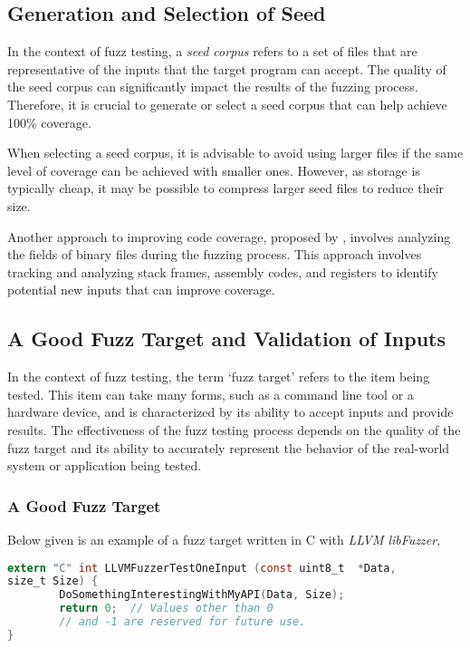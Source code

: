 \subsection{Generation and Selection of Seed}

In the context of fuzz testing, a \textit{seed corpus} refers to a set of files that are representative of
the inputs that the target program can accept. The quality of the seed corpus can significantly
impact the results of the fuzzing process. Therefore, it is crucial to generate or select a
seed corpus that can help achieve 100\% coverage.

When selecting a seed corpus, it is advisable to avoid using larger files if the same level of
coverage can be achieved with smaller ones. However, as storage is typically cheap, it may be
possible to compress larger seed files to reduce their size.

Another approach to improving code coverage, proposed by \cite{kim2011efficient},
involves analyzing the fields of binary files during the fuzzing process. This approach involves
tracking and analyzing stack frames, assembly codes, and registers to identify potential new inputs
that can improve coverage.\newline

\subsection{A Good Fuzz Target and Validation of Inputs}
In the context of fuzz testing, the term `fuzz target' refers to the item being tested.
This item can take many forms, such as a command line tool or a hardware device, and is
characterized by its ability to accept inputs and provide results. The effectiveness of
the fuzz testing process depends on the quality of the fuzz target and its ability to
accurately represent the behavior of the real-world system or application being tested\cite{238602}.

\subsubsection{A Good Fuzz Target}
Below given is an example of a fuzz target written in C with \textit{LLVM libFuzzer}\cite{libFuzze17:online},
\begin{lstlisting}[language=C]
extern "C" int LLVMFuzzerTestOneInput (const uint8_t  *Data,
size_t Size) {
        DoSomethingInterestingWithMyAPI(Data, Size);
        return 0;  // Values other than 0
        // and -1 are reserved for future use.
}
\end{lstlisting}

